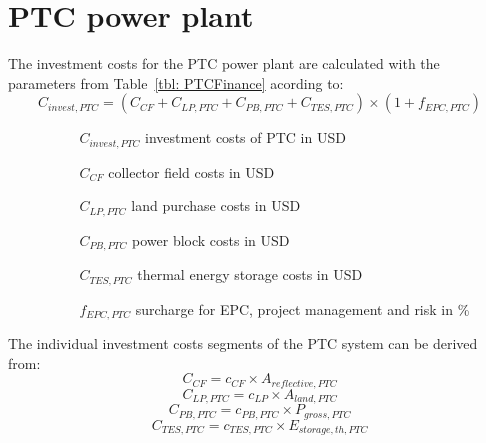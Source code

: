 \section{PTC power plant}
The investment costs for the PTC power plant are calculated with the parameters from Table~\ref{tbl: PTCFinance} acording to:
\begin{equation}
C_{invest,PTC} = (C_{CF}+C_{LP,PTC}+C_{PB,PTC}+C_{TES,PTC})\times(1+f_{EPC,PTC}) \label{GL_CRInvest}
\end{equation} 
\begin{itemize}
\item[ ] 
\begin{itemize}
\item[ ] 
\begin{itemize}
\item[$C_{invest,PTC}$]investment costs of PTC in USD
\item[$C_{CF}$]collector field costs in USD
\item[$C_{LP,PTC}$]land purchase costs in USD
\item[$C_{PB,PTC}$]power block costs in USD
\item[$C_{TES,PTC}$]thermal energy storage costs in USD
\item[$f_{EPC,PTC}$]surcharge for EPC, project management and risk in \%
\end{itemize}
\end{itemize}
\end{itemize}
The individual investment costs segments of the PTC system can be derived from:
\begin{equation}
C_{CF} = c_{CF} \times A_{reflective,PTC}
\end{equation} 
\begin{equation}
C_{LP,PTC} = c_{LP} \times A_{land,PTC}
\end{equation} 
\begin{equation}
C_{PB,PTC} = c_{PB,PTC} \times P_{gross,PTC}
\end{equation} 
\begin{equation}
C_{TES,PTC} = c_{TES,PTC} \times E_{storage,th,PTC}
\end{equation} 
